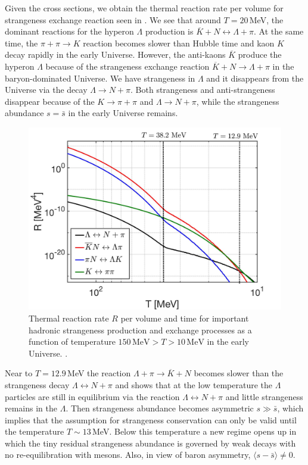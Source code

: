 Given the cross sections, we obtain the thermal reaction rate per volume for strangeness exchange reaction seen in . We see that around $T=20$\,MeV, the dominant reactions for the hyperon $\Lambda$ production is $\overline{K}+N\leftrightarrow\Lambda+\pi$. At the same time, the $\pi+\pi\to K$ reaction becomes slower than Hubble time and kaon $K$ decay rapidly in the early Universe. However, the anti-kaons $\overline K$ produce the hyperon $\Lambda$ because of the strangeness exchange reaction $\overline{K}+N\rightarrow\Lambda+\pi$ in the baryon-dominated Universe. We have strangeness in $\Lambda$ and it disappears from the Universe via the decay $\Lambda\rightarrow N+\pi$. Both strangeness and anti-strangeness disappear because of the $K\rightarrow\pi+\pi$ and $\Lambda\rightarrow N+\pi$, while the strangeness abundance $s = \bar{s}$ in the early Universe remains.

\begin{figure} 
\centerline{\includegraphics[width=0.9\linewidth]{./plots/NewHyperonRate_C.jpg}}
\caption{Thermal reaction rate $R$ per volume and time for important hadronic strangeness production and exchange processes as a function of temperature $150\,\mathrm{MeV}> T>10\,\mathrm{MeV}$ in the early Universe. . }
\label{Lambda_Rate_volume.fig} 
\end{figure}

Near to $T=12.9$\,MeV  the reaction $\Lambda+\pi\rightarrow\overline{K}+N$ becomes slower than the strangeness decay $\Lambda\leftrightarrow N+\pi$ and shows that at the low temperature the $\Lambda$ particles are still in equilibrium via the reaction $\Lambda\leftrightarrow N+\pi$ and little strangeness remains in the $\Lambda$. Then strangeness abundance becomes asymmetric $s\gg \bar{s}$, which implies that the assumption for strangeness conservation can only be valid until the temperature $T\sim13$\,MeV. Below this temperature a new regime opens up in which the tiny residual strangeness abundance is governed by weak decays with no re-equilibration with mesons. Also, in view of baron asymmetry, $\langle s-\bar s\rangle \ne 0$.

